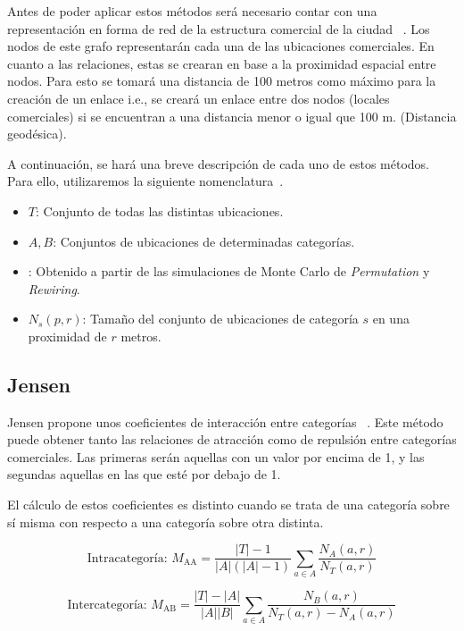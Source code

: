 Antes de poder aplicar estos métodos será necesario contar con una representación en forma de red de la estructura comercial de la ciudad ~\cite{Ahedo2021,RSVAJSSHJG}. Los nodos de este grafo representarán cada una de las ubicaciones comerciales. En cuanto a las relaciones, estas se crearan en base a la proximidad espacial entre nodos. Para esto se tomará una distancia de 100 metros como máximo para la creación de un enlace i.e., se creará un enlace entre dos nodos (locales comerciales) si se encuentran a una distancia menor o igual que 100 m. (Distancia geodésica).

A continuación, se hará una breve descripción de cada uno de estos métodos. Para ello, utilizaremos la siguiente nomenclatura~\cite{Ahedo2021,RSVAJSSHJG}.
\begin{itemize}
	\item $T$: Conjunto de todas las distintas ubicaciones.
	\item $A,B$: Conjuntos de ubicaciones de determinadas categorías.
	\item {}: Obtenido a partir de las simulaciones de Monte Carlo de \textit{Permutation} y \textit{Rewiring}.
	\item $N_s(p,r)$: Tamaño del conjunto de ubicaciones de categoría $s$ en una proximidad de $r$ metros.
\end{itemize}

\subsection{Jensen}


Jensen propone unos coeficientes de interacción entre categorías ~\cite{Jensen2006}. Este método puede obtener tanto las relaciones de atracción como de repulsión entre categorías comerciales. Las primeras serán aquellas con un valor por encima de 1, y las segundas aquellas en las que esté por debajo de 1.

El cálculo de estos coeficientes es distinto cuando se trata de una categoría sobre sí misma con respecto a una categoría sobre otra distinta.

\begin{equation*}
	\text{Intracategoría: } M_\text{AA} = \frac{|T| - 1}{|A|(|A|-1)} \sum_{a \in A}\frac{N_A(a,r)}{N_T(a,r)}
\end{equation*}

\begin{equation*}
	\text{Intercategoría: }M_\text{AB} = \frac{|T| - |A|}{|A||B|} \sum_{a \in A}\frac{N_B(a,r)}{N_T(a,r) - N_A(a,r)}
\end{equation*}

